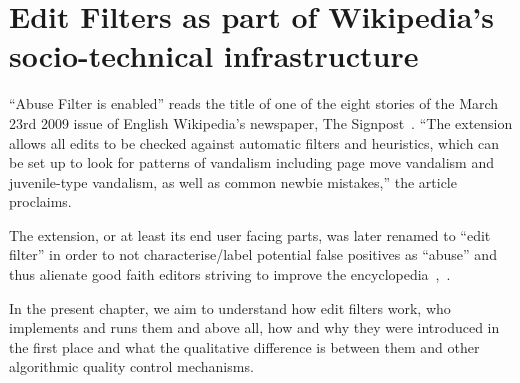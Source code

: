 \chapter{Edit Filters as part of Wikipedia's socio-technical infrastructure}
\label{chap:filters}


``Abuse Filter is enabled'' reads the title of one of the eight stories of the March 23rd 2009 issue of English Wikipedia's newspaper, The Signpost~\cite{Signpost2009}.
``The extension allows all edits to be checked against automatic filters and heuristics, which can be set up to look for patterns of vandalism including page move vandalism and juvenile-type vandalism, as well as common newbie mistakes,'' the article proclaims.

The extension, or at least its end user facing parts, was later renamed to ``edit filter'' in order to not characterise/label potential false positives as ``abuse'' and thus alienate good faith editors striving to improve the encyclopedia~\cite{Wikipedia:EditFilter},~\cite{Wikipedia:EditFilterTalkArchive1}.

In the present chapter, we aim to understand how edit filters work, who implements and runs them and above all, how and why they were introduced in the first place and what the qualitative difference is between them and other algorithmic quality control mechanisms.

